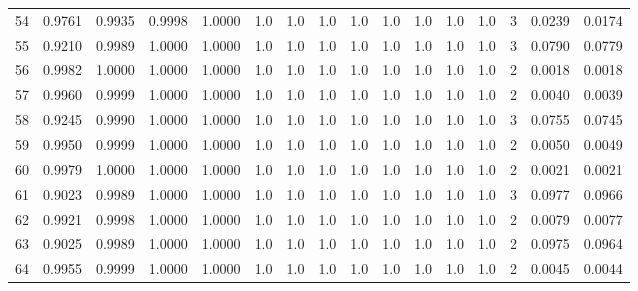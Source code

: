 \begin{tabular}{lrrrrrrrrrrrrrrr}
54  &      0.9761 &  0.9935 &  0.9998 &  1.0000 &     1.0 &     1.0 &     1.0 &     1.0 &     1.0 &     1.0 &      1.0 &        1.0 &      3 &                    0.0239 &                     0.0174 \\
55  &      0.9210 &  0.9989 &  1.0000 &  1.0000 &     1.0 &     1.0 &     1.0 &     1.0 &     1.0 &     1.0 &      1.0 &        1.0 &      3 &                    0.0790 &                     0.0779 \\
56  &      0.9982 &  1.0000 &  1.0000 &  1.0000 &     1.0 &     1.0 &     1.0 &     1.0 &     1.0 &     1.0 &      1.0 &        1.0 &      2 &                    0.0018 &                     0.0018 \\
57  &      0.9960 &  0.9999 &  1.0000 &  1.0000 &     1.0 &     1.0 &     1.0 &     1.0 &     1.0 &     1.0 &      1.0 &        1.0 &      2 &                    0.0040 &                     0.0039 \\
58  &      0.9245 &  0.9990 &  1.0000 &  1.0000 &     1.0 &     1.0 &     1.0 &     1.0 &     1.0 &     1.0 &      1.0 &        1.0 &      3 &                    0.0755 &                     0.0745 \\
59  &      0.9950 &  0.9999 &  1.0000 &  1.0000 &     1.0 &     1.0 &     1.0 &     1.0 &     1.0 &     1.0 &      1.0 &        1.0 &      2 &                    0.0050 &                     0.0049 \\
60  &      0.9979 &  1.0000 &  1.0000 &  1.0000 &     1.0 &     1.0 &     1.0 &     1.0 &     1.0 &     1.0 &      1.0 &        1.0 &      2 &                    0.0021 &                     0.0021 \\
61  &      0.9023 &  0.9989 &  1.0000 &  1.0000 &     1.0 &     1.0 &     1.0 &     1.0 &     1.0 &     1.0 &      1.0 &        1.0 &      3 &                    0.0977 &                     0.0966 \\
62  &      0.9921 &  0.9998 &  1.0000 &  1.0000 &     1.0 &     1.0 &     1.0 &     1.0 &     1.0 &     1.0 &      1.0 &        1.0 &      2 &                    0.0079 &                     0.0077 \\
63  &      0.9025 &  0.9989 &  1.0000 &  1.0000 &     1.0 &     1.0 &     1.0 &     1.0 &     1.0 &     1.0 &      1.0 &        1.0 &      2 &                    0.0975 &                     0.0964 \\
64  &      0.9955 &  0.9999 &  1.0000 &  1.0000 &     1.0 &     1.0 &     1.0 &     1.0 &     1.0 &     1.0 &      1.0 &        1.0 &      2 &                    0.0045 &                     0.0044 \\

\end{tabular}
